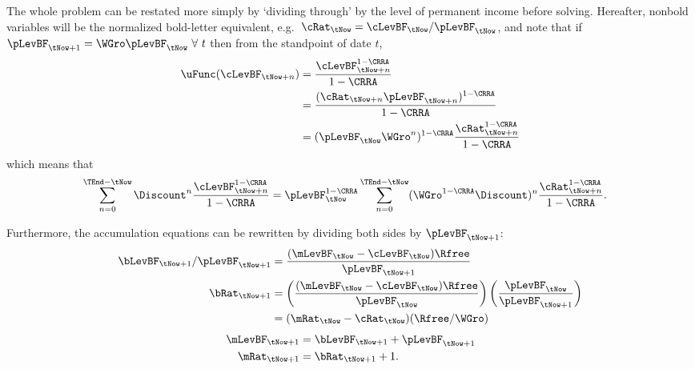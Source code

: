 The whole problem can be restated more simply by `dividing through' by the level of
permanent income before solving.  Hereafter, nonbold variables will be
the normalized bold-letter equivalent, e.g.\
$\cRat_{\tNow}=\cLevBF_{\tNow}/\pLevBF_{\tNow}$, and note that if
$\pLevBF_{\tNow+1}={\WGro} \pLevBF_{\tNow}~\forall~t$ then from the standpoint
of date $t$,
\begin{equation}\begin{gathered}\begin{aligned}
        \uFunc(\cLevBF_{\tNow+n}) & =  \frac{\cLevBF_{\tNow+n}^{1-\CRRA}}{1-\CRRA}  \\
         & =  \frac{(\cRat_{\tNow+n}\pLevBF_{\tNow+n})^{1-\CRRA}}{1-\CRRA}  \\
         & =  (\pLevBF_{\tNow}{\WGro}^{n})^{1-\CRRA}\frac{\cRat_{\tNow+n}^{1-\CRRA}}{1-\CRRA}
\end{aligned}\end{gathered}\end{equation}
which means that
\begin{equation}\begin{gathered}\begin{aligned}
        \sum_{n=0}^{\TEnd-\tNow} \Discount^{n}\frac{\cLevBF_{\tNow+n}^{1-\CRRA}}{1-\CRRA} & =  \pLevBF_{\tNow}^{1-\CRRA}\sum_{n=0}^{\TEnd-\tNow} ({\WGro}^{1-\CRRA}\Discount)^{n} \frac{\cRat_{\tNow+n}^{1-\CRRA}}{1-\CRRA}  \label{eq:maxc2}
.
\end{aligned}\end{gathered}\end{equation}

Furthermore, the accumulation equations can be rewritten by dividing
both sides by $\pLevBF_{\tNow+1}$:
\begin{equation}\begin{gathered}\begin{aligned}
        \bLevBF_{\tNow+1}/\pLevBF_{\tNow+1} & =  \frac{(\mLevBF_{\tNow}-\cLevBF_{\tNow})\Rfree}{\pLevBF_{\tNow+1}}  \\
        \bRat_{\tNow+1} & =   \left(\frac{(\mLevBF_{\tNow}-\cLevBF_{\tNow})\Rfree}{\pLevBF_{\tNow}}\right)\left(\frac{\pLevBF_{\tNow}}{\pLevBF_{\tNow+1}}\right) \\
         & =  (\mRat_{\tNow}-\cRat_{\tNow})(\Rfree/{\WGro})
\end{aligned}\end{gathered}\end{equation}
\begin{equation}\begin{gathered}\begin{aligned}
        \mLevBF_{\tNow+1} & =  \bLevBF_{\tNow+1}+\pLevBF_{\tNow+1}
\\      \mRat_{\tNow+1} & =  \bRat_{\tNow+1}+1.
\end{aligned}\end{gathered}\end{equation}


